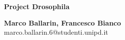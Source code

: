 \documentclass{article}
\begin{document}
\begin{center}
    \huge
    \textbf{Project Drosophila}  %
    
    \normalsize
    \vspace{0.4cm}
    \textbf{Marco Ballarin, Francesco Bianco}   \\ %
    marco.ballarin.6@studenti.unipd.it
\end{center}
\newpage
\tableofcontents
\newpage


\newpage


\newpage
\printbibliography
\end{document}
